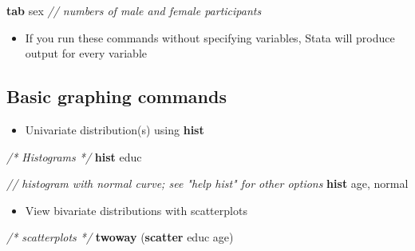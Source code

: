 \documentclass[]{book}
\newenvironment{Shaded}{\begin{snugshade}}{\end{snugshade}}
\newcommand{\CommentTok}[1]{\textcolor[rgb]{0.56,0.35,0.01}{\textit{#1}}}
\newcommand{\FunctionTok}[1]{\textcolor[rgb]{0.00,0.00,0.00}{#1}}
\newcommand{\KeywordTok}[1]{\textcolor[rgb]{0.13,0.29,0.53}{\textbf{#1}}}
\newcommand{\NormalTok}[1]{#1}
\providecommand{\tightlist}{%
  \setlength{\itemsep}{0pt}\setlength{\parskip}{0pt}}
\begin{document}
\begin{Shaded}
\begin{Highlighting}[]
\KeywordTok{tab}\NormalTok{ sex }\CommentTok{// numbers of male and female participants}
\end{Highlighting}
\end{Shaded}

\begin{itemize}
\tightlist
\item
  If you run these commands without specifying variables, Stata will produce output for every variable
\end{itemize}

\hypertarget{basic-graphing-commands}{%
\subsection{Basic graphing commands}\label{basic-graphing-commands}}

\begin{itemize}
\tightlist
\item
  Univariate distribution(s) using \textbf{hist}
\end{itemize}

\begin{Shaded}
\begin{Highlighting}[]
  \CommentTok{/* Histograms */}
  \KeywordTok{hist}\NormalTok{ educ}
\end{Highlighting}
\end{Shaded}

\begin{Shaded}
\begin{Highlighting}[]
  \CommentTok{// histogram with normal curve; see "help hist" for other options}
  \KeywordTok{hist}\NormalTok{ age, }\FunctionTok{normal}  
\end{Highlighting}
\end{Shaded}

\begin{itemize}
\tightlist
\item
  View bivariate distributions with scatterplots
\end{itemize}

\begin{Shaded}
\begin{Highlighting}[]
   \CommentTok{/* scatterplots */}
   \KeywordTok{twoway}\NormalTok{ (}\KeywordTok{scatter}\NormalTok{ educ age)}
\end{Highlighting}
\end{Shaded}
\end{document}
